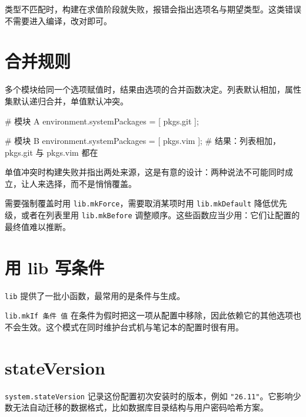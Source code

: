 类型不匹配时，构建在求值阶段就失败，报错会指出选项名与期望类型。这类错误不需要进入编译，改对即可。

\section{合并规则}

多个模块给同一个选项赋值时，结果由选项的合并函数决定。列表默认相加，属性集默认递归合并，单值默认冲突。

\begin{nixcode}
# 模块 A
environment.systemPackages = [ pkgs.git ];

# 模块 B
environment.systemPackages = [ pkgs.vim ];
# 结果：列表相加，pkgs.git 与 pkgs.vim 都在
\end{nixcode}

单值冲突时构建失败并指出两处来源，这是有意的设计：两种说法不可能同时成立，让人来选择，而不是悄悄覆盖。

需要强制覆盖时用 \texttt{lib.mkForce}，需要取消某项时用 \texttt{lib.mkDefault} 降低优先级，或者在列表里用 \texttt{lib.mkBefore} 调整顺序。这些函数应当少用：它们让配置的最终值难以推断。

\section{用 lib 写条件}

\texttt{lib} 提供了一批小函数，最常用的是条件与生成。


\texttt{lib.mkIf 条件 值} 在条件为假时把这一项从配置中移除，因此依赖它的其他选项也不会生效。这个模式在同时维护台式机与笔记本的配置时很有用。

\section{stateVersion}

\texttt{system.stateVersion} 记录这份配置初次安装时的版本，例如 \texttt{"26.11"}。它影响少数无法自动迁移的数据格式，比如数据库目录结构与用户密码哈希方案。

